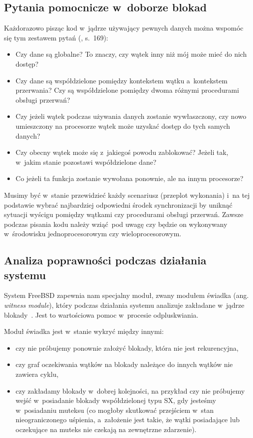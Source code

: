 \documentclass[shortabstract]{iithesis}
\theoremstyle{definition} \newtheorem*{definition}{Definicja}
\theoremstyle{definition} \newtheorem*{example}{Przykład}
\theoremstyle{definition} \newtheorem*{remark}{Uwaga}
\begin{document}
\subsection{Pytania pomocnicze w~doborze blokad}
Każdorazowo pisząc kod w~jądrze używający pewnych danych można wspomóc się tym
zestawem pytań (\cite{bib:lkd}, s.~169):
\begin{itemize}
\item Czy dane są globalne? To znaczy, czy wątek inny niż mój może mieć do nich dostęp?
\item Czy dane są współdzielone pomiędzy kontekstem wątku a~kontekstem przerwania?
Czy są współdzielone pomiędzy dwoma różnymi procedurami obsługi przerwań?
\item Czy jeżeli wątek podczas używania danych zostanie wywłaszczony, czy nowo umieszczony na procesorze
wątek może uzyskać dostęp do tych samych danych?
\item Czy obecny wątek może się z~jakiegoś powodu zablokować? Jeżeli tak, w~jakim stanie pozostawi
współdzielone dane?
\item Co jeżeli ta funkcja zostanie wywołana ponownie, ale na innym procesorze?
\end{itemize}
Musimy być w~stanie przewidzieć każdy scenariusz (przeplot wykonania) i~na tej podstawie wybrać najbardziej odpowiedni
środek synchronizacji by uniknąć sytuacji wyścigu pomiędzy wątkami czy procedurami obsługi przerwań.
Zawsze podczas pisania kodu należy wziąć pod uwagę czy będzie on wykonywany w~środowisku jednoprocesorowym
czy wieloprocesorowym.

\subsection{Analiza poprawności podczas działania systemu}
System FreeBSD zapewnia nam specjalny moduł, zwany modułem świadka (ang. \textit{witness module}),
który podczas działania systemu analizuje zakładane w~jądrze blokady~\cite{freebsd:witness}.
Jest to wartościowa pomoc w~procesie odpluskwiania.

Moduł świadka jest w~stanie wykryć między innymi:
\begin{itemize}
\item czy nie próbujemy ponownie założyć blokady, która nie jest rekurencyjna,
\item czy graf oczekiwania wątków na blokady należące do innych wątków nie zawiera cyklu,
\item czy zakładamy blokady w~dobrej kolejności, na przykład czy nie próbujemy wejść w~posiadanie blokady
współdzielonej typu SX, gdy jesteśmy w~posiadaniu muteksu (co mogłoby skutkować przejściem w~stan nieograniczonego
uśpienia, a~założenie jest takie, że wątki posiadające lub oczekujące na muteks nie czekają na zewnętrzne zdarzenie).
\end{itemize}
\end{document}
